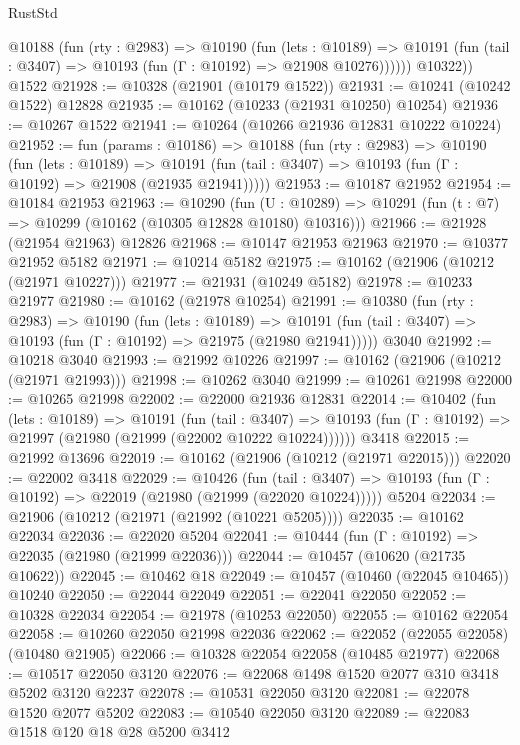 \begin{lexlean}{RustStd}
\begin{coremodule}
          @10188
            (fun (rty : @2983) =>
            @10190
              (fun (lets : @10189) =>
              @10191 (fun (tail : @3407) => @10193 (fun (Γ : @10192) => @21908 @10276))))))
        @10322))
    @1522
@21928 := @10328 (@21901 (@10179 @1522))
@21931 := @10241 (@10242 @1522) @12828
@21935 := @10162 (@10233 (@21931 @10250) @10254)
@21936 := @10267 @1522
@21941 := @10264 (@10266 @21936 @12831 @10222 @10224)
@21952 := fun (params : @10186) =>
  @10188
    (fun (rty : @2983) =>
    @10190
      (fun (lets : @10189) =>
      @10191 (fun (tail : @3407) => @10193 (fun (Γ : @10192) => @21908 (@21935 @21941)))))
@21953 := @10187 @21952
@21954 := @10184 @21953
@21963 := @10290
    (fun (U : @10289) => @10291 (fun (t : @7) => @10299 (@10162 (@10305 @12828 @10180) @10316)))
@21966 := @21928 (@21954 @21963) @12826
@21968 := @10147 @21953 @21963
@21970 := @10377 @21952 @5182
@21971 := @10214 @5182
@21975 := @10162 (@21906 (@10212 (@21971 @10227)))
@21977 := @21931 (@10249 @5182)
@21978 := @10233 @21977
@21980 := @10162 (@21978 @10254)
@21991 := @10380
    (fun (rty : @2983) =>
    @10190
      (fun (lets : @10189) =>
      @10191 (fun (tail : @3407) => @10193 (fun (Γ : @10192) => @21975 (@21980 @21941)))))
    @3040
@21992 := @10218 @3040
@21993 := @21992 @10226
@21997 := @10162 (@21906 (@10212 (@21971 @21993)))
@21998 := @10262 @3040
@21999 := @10261 @21998
@22000 := @10265 @21998
@22002 := @22000 @21936 @12831
@22014 := @10402
    (fun (lets : @10189) =>
    @10191
      (fun (tail : @3407) =>
      @10193 (fun (Γ : @10192) => @21997 (@21980 (@21999 (@22002 @10222 @10224))))))
    @3418
@22015 := @21992 @13696
@22019 := @10162 (@21906 (@10212 (@21971 @22015)))
@22020 := @22002 @3418
@22029 := @10426
    (fun (tail : @3407) => @10193 (fun (Γ : @10192) => @22019 (@21980 (@21999 (@22020 @10224)))))
    @5204
@22034 := @21906 (@10212 (@21971 (@21992 (@10221 @5205))))
@22035 := @10162 @22034
@22036 := @22020 @5204
@22041 := @10444 (fun (Γ : @10192) => @22035 (@21980 (@21999 @22036)))
@22044 := @10457 (@10620 (@21735 @10622))
@22045 := @10462 @18
@22049 := @10457 (@10460 (@22045 @10465)) @10240
@22050 := @22044 @22049
@22051 := @22041 @22050
@22052 := @10328 @22034
@22054 := @21978 (@10253 @22050)
@22055 := @10162 @22054
@22058 := @10260 @22050 @21998 @22036
@22062 := @22052 (@22055 @22058) (@10480 @21905)
@22066 := @10328 @22054 @22058 (@10485 @21977)
@22068 := @10517 @22050 @3120
@22076 := @22068 @1498 @1520 @2077 @310 @3418 @5202 @3120 @2237
@22078 := @10531 @22050 @3120
@22081 := @22078 @1520 @2077 @5202
@22083 := @10540 @22050 @3120
@22089 := @22083 @1518 @120 @18 @28 @5200 @3412

\end{coremodule}
\end{lexlean}
